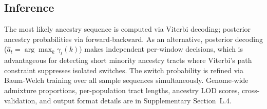 \subsection{Inference}

The most likely ancestry sequence is computed via Viterbi decoding; posterior ancestry probabilities via forward-backward. As an alternative, posterior decoding ($\hat{a}_t = \arg\max_k \gamma_t(k)$) makes independent per-window decisions, which is advantageous for detecting short minority ancestry tracts where Viterbi's path constraint suppresses isolated switches. The switch probability is refined via Baum-Welch training over all sample sequences simultaneously. Genome-wide admixture proportions, per-population tract lengths, ancestry LOD scores, cross-validation, and output format details are in Supplementary Section~L.4.
